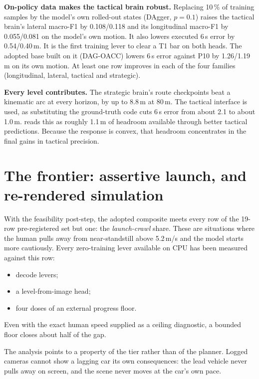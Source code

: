 \documentclass[10pt,twocolumn]{article}
\theoremstyle{remark}
\begin{document}
\textbf{On-policy data makes the tactical brain robust.} Replacing 10\,\% of training samples by the model's own rolled-out states
(DAgger, $p=0.1$) raises the tactical brain's lateral macro-F1 by 0.108/0.118 and its longitudinal macro-F1 by 0.055/0.081 on the
model's own motion. It also lowers executed 6\,s error by 0.54/0.40\,m. It is the first training lever to clear a T1 bar on both
heads. The adopted base built on it (DAG-OACC) lowers 6\,s error against P10 by 1.26/1.19\,m on its own motion. At least one row
improves in each of the four families (longitudinal, lateral, tactical and strategic).

\textbf{Every level contributes.} The strategic brain's route checkpoints beat a kinematic arc at every horizon, by up to 8.8\,m at
80\,m. The tactical interface is used, as substituting the ground-truth code cuts 6\,s error from about 2.1 to about 1.0\,m.
 reads this as roughly 1.1\,m of headroom available through better tactical predictions. Because the response is
convex, that headroom concentrates in the final gains in tactical precision.

\section{The frontier: assertive launch, and re-rendered simulation}\label{sec:frontier}
With the feasibility post-step, the adopted composite meets every row of the 19-row pre-registered set but one: the \emph{launch-crawl}
share. These are situations where the human pulls away from near-standstill above 5.2\,m/s and the model starts more cautiously.
Every zero-training lever available on CPU has been measured against this row:
\begin{itemize}
  \item decode levers;
  \item a level-from-image head;
  \item four doses of an external progress floor.
\end{itemize}
Even with the exact human speed supplied as a ceiling diagnostic, a bounded floor closes about half of the gap.

The analysis points to a property of the tier rather than of the planner. Logged cameras cannot show a lagging car its own
consequences: the lead vehicle never pulls away on screen, and the scene never moves at the car's own pace.
\end{document}
